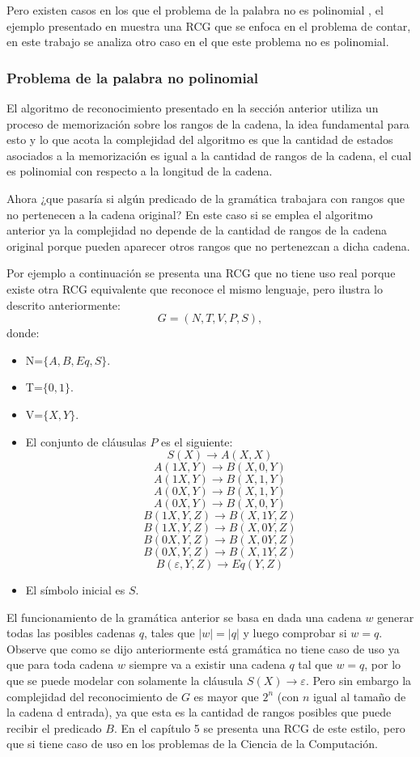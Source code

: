 \documentclass[12pt]{article}
\begin{document}
Pero existen casos en los que el problema de la palabra no
es polinomial \cite{propertiesRCGBib}, el ejemplo presentado en \cite{propertiesRCGBib} muestra una RCG que se enfoca en el problema de contar,
en este trabajo se analiza otro caso en el que este problema no es polinomial.

\subsubsection{Problema de la palabra no polinomial}

El algoritmo de reconocimiento presentado en la sección anterior utiliza un proceso de memorización sobre los rangos
de la cadena, la idea fundamental para esto y lo que acota la complejidad del algoritmo es que la cantidad de estados
asociados a la memorización es igual a la cantidad de rangos de la cadena, el cual es polinomial con respecto a la longitud
de la cadena.

Ahora ¿que pasaría si algún predicado de la gramática trabajara con rangos que no pertenecen a la cadena original?
En este caso si se emplea el algoritmo anterior ya la complejidad no depende de la cantidad de rangos de la cadena original
porque pueden aparecer otros rangos que no pertenezcan a dicha cadena.

Por ejemplo a continuación se presenta una RCG que no tiene uso real porque existe otra RCG equivalente que reconoce el
mismo lenguaje, pero ilustra lo descrito anteriormente:
\[
    G = (N, T, V, P, S),
\]
donde:

\begin{itemize}
    \item  N=$\{A,B,Eq,S\}$.
    \item T=$\{0,1\}$.
    \item V=$\{X,Y\}$.
    \item El conjunto de cláusulas $P$ es el siguiente:
          $$S(X)\to A(X,X)$$
          $$A(1X,Y)\to B(X,0,Y)$$
          $$A(1X,Y)\to B(X,1,Y)$$
          $$A(0X,Y)\to B(X,1,Y)$$
          $$A(0X,Y)\to B(X,0,Y)$$
          $$B(1X,Y,Z)\to B(X,1Y,Z)$$
          $$B(1X,Y,Z)\to B(X,0Y,Z)$$
          $$B(0X,Y,Z)\to B(X,0Y,Z)$$
          $$B(0X,Y,Z)\to B(X,1Y,Z)$$
          $$B(\varepsilon,Y,Z)\to Eq(Y,Z)$$
    \item El símbolo inicial es $S$.
\end{itemize}

El funcionamiento de la gramática anterior se basa en dada una cadena $w$ generar todas las posibles cadenas $q$, tales
que $|w|=|q|$ y luego comprobar si $w = q$. Observe que como se dijo anteriormente está gramática no tiene caso de uso
ya que para toda cadena $w$ siempre va a existir una cadena $q$ tal que $w=q$, por lo que se puede modelar con solamente
la cláusula $S(X)\to \varepsilon$. Pero sin embargo la complejidad del reconocimiento de $G$ es mayor que $2^n$ (con $n$
igual al tamaño de la cadena d entrada), ya que esta es la cantidad de rangos posibles que puede recibir el predicado $B$.
En el capítulo 5 se presenta una RCG de este estilo, pero que si tiene caso de uso en los problemas de la Ciencia de la Computación.
\end{document}
